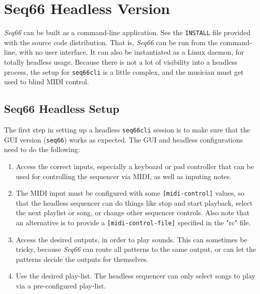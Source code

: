 %
%
%

\section{Seq66 Headless Version}
\label{sec:headless}

   \textsl{Seq66} can be built as a command-line application.
   See the \texttt{INSTALL} file provided with the source code distribution.
   That is, \textsl{Seq66}
   can be run from the command-line, with no user interface.
   It can also be instantiated as a Linux daemon, for totally headless usage.
   Because there is not a lot of visibility into a headless process, the
   setup for \texttt{seq66cli} is a little complex, and the musician must get
   used to blind MIDI control.

\subsection{Seq66 Headless Setup}
\label{subsec:headless_setup}

   The first step in setting up a headless \texttt{seq66cli} session is
   to make sure that the GUI version (\texttt{seq66}) works as expected.
   The GUI and headless configurations need to do the following:
   
   \begin{enumerate}
      \item Access the correct inputs, especially a keyboard or pad controller
         that can be used for controlling the sequencer via MIDI, as well as
         inputing notes.
      \item The MIDI input must be configured with some \texttt{[midi-control]}
         values, so that the headless sequencer can do things like stop and
         start playback, select the next playlist or song, or change other
         sequencer controls.  Also note that an alternative is to provide a 
         \texttt{[midi-control-file]} specified in the "rc" file.
      \item Access the desired outputs, in order to play sounds.  This can
         sometimes be tricky, because \textsl{Seq66} can route all
         patterns to the same output, or can let the patterns decide the
         outputs for themselves.
      \item Use the desired play-list.  The headless sequencer can only select
         songs to play via a pre-configured play-list.
   \end{enumerate}

